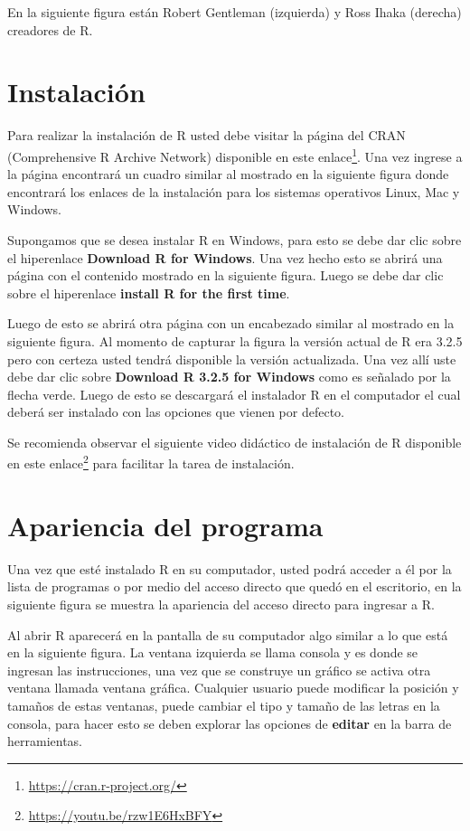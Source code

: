 \documentclass[
]{book}
\renewcommand{\href}[2]{#2\footnote{\url{#1}}}
\begin{document}
En la siguiente figura están Robert Gentleman (izquierda) y Ross Ihaka (derecha) creadores de R.

\hypertarget{instalaciuxf3n}{%
\section{Instalación}\label{instalaciuxf3n}}

Para realizar la instalación de R usted debe visitar la página del CRAN (Comprehensive R Archive Network) disponible en este \href{https://cran.r-project.org/}{enlace}. Una vez ingrese a la página encontrará un cuadro similar al mostrado en la siguiente figura donde encontrará los enlaces de la instalación para los sistemas operativos Linux, Mac y Windows.

Supongamos que se desea instalar R en Windows, para esto se debe dar clic sobre el hiperenlace \textbf{Download R for Windows}. Una vez hecho esto se abrirá una página con el contenido mostrado en la siguiente figura. Luego se debe dar clic sobre el hiperenlace \textbf{install R for the first time}.

Luego de esto se abrirá otra página con un encabezado similar al mostrado en la siguiente figura. Al momento de capturar la figura la versión actual de R era 3.2.5 pero con certeza usted tendrá disponible la versión actualizada. Una vez allí uste debe dar clic sobre \textbf{Download R 3.2.5 for Windows} como es señalado por la flecha verde. Luego de esto se descargará el instalador R en el computador el cual deberá ser instalado con las opciones que vienen por defecto.

Se recomienda observar el siguiente video didáctico de instalación de R disponible en este \href{https://youtu.be/rzw1E6HxBFY}{enlace} para facilitar la tarea de instalación.

\hypertarget{apariencia-del-programa}{%
\section{Apariencia del programa}\label{apariencia-del-programa}}

Una vez que esté instalado R en su computador, usted podrá acceder a él por la lista de programas o por medio del acceso directo que quedó en el escritorio, en la siguiente figura se muestra la apariencia del acceso directo para ingresar a R.

Al abrir R aparecerá en la pantalla de su computador algo similar a lo que está en la siguiente figura. La ventana izquierda se llama consola y es donde se ingresan las instrucciones, una vez que se construye un gráfico se activa otra ventana llamada ventana gráfica. Cualquier usuario puede modificar la posición y tamaños de estas ventanas, puede cambiar el tipo y tamaño de las letras en la consola, para hacer esto se deben explorar las opciones de \textbf{editar} en la barra de herramientas.
\end{document}
